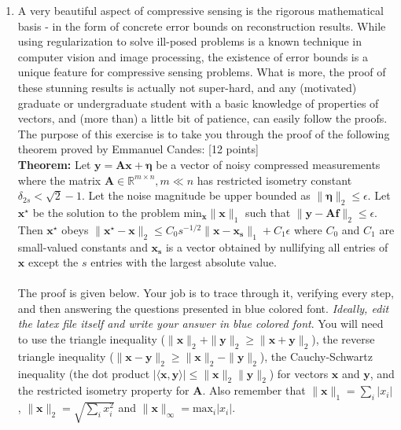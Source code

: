 \documentclass[11pt]{article}
\begin{document}
\begin{enumerate}
\item A very beautiful aspect of compressive sensing is the rigorous mathematical basis - in the form of concrete error bounds on reconstruction results. While using regularization to solve ill-posed problems is a known technique in computer vision and image processing, the existence of error bounds is a unique feature for compressive sensing problems. What is more, the proof of these stunning results is actually not super-hard, and any (motivated) graduate or undergraduate student with a basic knowledge of properties of vectors, and (more than) a little bit of patience, can easily follow the proofs. The purpose of this exercise is to take you through the proof of the following theorem proved by Emmanuel Candes: \textsf{[12 points]}
\\
\textbf{Theorem:} Let $\mathbf{y} = \mathbf{Ax}+\mathbf{\eta}$ be a vector of noisy compressed measurements where the matrix $\mathbf{A} \in \mathbb{R}^{m \times n},  m \ll n$ has restricted isometry constant $\delta_{2s} < \sqrt{2}-1$. Let the noise magnitude be upper bounded as $\|\mathbf{\eta}\|_2 \leq \epsilon$. Let $\mathbf{x}^{\star}$ be the solution to the problem $\textrm{min}_{\mathbf{x}} \|\mathbf{x}\|_1$ such that $\|\mathbf{y} - \mathbf{Af}\|_2 \leq \epsilon$. Then $\mathbf{x^{\star}}$ obeys 
$\|\mathbf{x^{\star} - x}\|_2 \leq C_0 s^{-1/2}\|\mathbf{x - x_s}\|_1  + C_1 \epsilon$ where $C_0$ and $C_1$ are small-valued constants and $\mathbf{x_s}$ is a vector obtained by nullifying all entries of $\mathbf{x}$ except the $s$ entries with the largest absolute value. 
\\
\\
The proof is given below. Your job is to trace through it, verifying every step, and then answering the questions presented in blue colored font. \emph{Ideally, edit the latex file itself and write your answer in blue colored font}.
You will need to use the triangle inequality ($\|\mathbf{x}\|_2 + \|\mathbf{y}\|_2 \geq \|\mathbf{x}+\mathbf{y}\|_2$), the reverse triangle inequality ($\|\mathbf{x}-\mathbf{y}\|_2 \geq \|\mathbf{x}\|_2 - \|\mathbf{y}\|_2$), the Cauchy-Schwartz inequality (the dot product $|\langle \mathbf{x}, \mathbf{y} \rangle| \leq \|\mathbf{x}\|_2 \|\mathbf{y}\|_2$) for vectors $\mathbf{x}$ and $\mathbf{y}$, and the restricted isometry property for $\mathbf{A}$. Also remember that $\|\mathbf{x}\|_1 = \sum_i |x_i|$, $\|\mathbf{x}\|_2 = \sqrt{\sum_i x^2_i}$ and $\|\mathbf{x}\|_{\infty} = \textrm{max}_i |x_i|$.
\\
\\

\end{enumerate}
\end{document}
